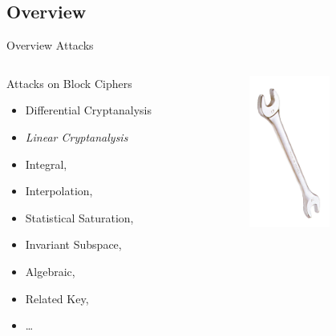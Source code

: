 \subsection{Overview}
\begin{frame}{Overview Attacks}
	\begin{columns}[onlytextwidth]
		\begin{column}{.58\textwidth}
	\begin{block}{Attacks on Block Ciphers}
		\begin{itemize}
			\item Differential Cryptanalysis
			\item \emph{Linear Cryptanalysis}
		\end{itemize}
		\begin{itemize}
			\item Integral,
			\item Interpolation,
			\item Statistical Saturation,
			\item Invariant Subspace,
			\item Algebraic,
			\item Related Key,
			\item \ldots
		\end{itemize}
	\end{block}
		\end{column}
		\hfill
		\begin{column}{.38\textwidth}
			\begin{figure}[!ht]
				\includegraphics[height=50mm]{data/wiki/wrench}
			\end{figure}
		\end{column}
	\end{columns}
\end{frame}

